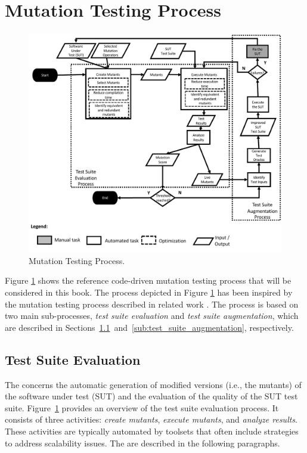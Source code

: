 
\section{Mutation Testing Process}
\label{sec:process}

	\begin{figure}
	\centering
		\includegraphics[width=\textwidth]{images/process}
		\caption{Mutation Testing Process.}
		\label{fig:code:process}
	\end{figure}

Figure \ref{fig:code:process} shows the reference code-driven mutation testing process that will be considered in this book. The process depicted in Figure \ref{fig:code:process} has been inspired by the mutation testing process described in related work \cite{offutt2001mutation,papadakis2019mutation}. The process is based on two main sub-processes, \emph{test suite evaluation} and \emph{test suite augmentation}, which are described in Sections~\ref{sub:test_suite_evaluation}~and~\ref{sub:test_suite_augmentation}, respectively.


\subsection{Test Suite Evaluation} %
\label{sub:test_suite_evaluation}

The  concerns the automatic generation of modified versions (i.e., the mutants) of the software under test (SUT) and the evaluation of the quality of the SUT test suite. 
Figure~\ref{fig:code:process} provides an overview of the test suite evaluation process.
It consists of three activities: \emph{create mutants}, \emph{execute mutants}, and \emph{analyze results}.  
These activities are typically automated by toolsets that often include strategies to address scalability issues. The are described in the following paragraphs.


